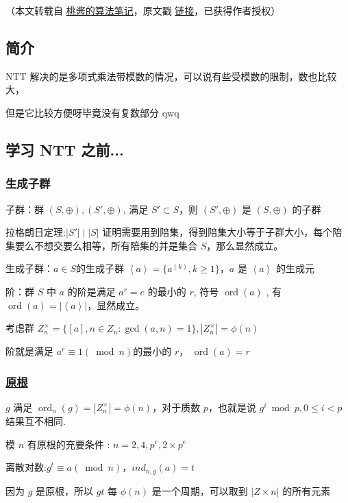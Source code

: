 
（本文转载自 \href{https://zhuanlan.zhihu.com/c_1005817911142838272}{桃酱的算法笔记}，原文戳 \href{https://zhuanlan.zhihu.com/p/41867199}{链接}，已获得作者授权）

\subsection{简介}

NTT 解决的是多项式乘法带模数的情况，可以说有些受模数的限制，数也比较大，

但是它比较方便呀毕竟没有复数部分 qwq

\subsection{学习 NTT 之前...}

\subsubsection{生成子群}

子群：群 $(S,⊕), (S′,⊕)$, 满足 $S′⊂S$，则 $(S′,⊕)$ 是 $(S,⊕)$ 的子群

拉格朗日定理:$|S′|∣|S |$ 证明需要用到陪集，得到陪集大小等于子群大小，每个陪集要么不想交要么相等，所有陪集的并是集合 $S$，那么显然成立。

生成子群：$a \in S$ ​的生成子群 $\left<a\right> = \{a^{(k)}, k \geq 1 \}$ ​，$a$ 是 $\left< a \right>$ 的生成元

阶：群 $S$ 中 $a$ 的阶是满足 $a^r=e$ 的最小的 $r$, 符号 $\operatorname{ord}(a)$ , 有 $\operatorname{ord}(a)=\left|\left<a\right>\right|$，显然成立。

考虑群 $Z_n^ \times =\{[a], n \in Z_n : \gcd(a, n) = 1\}, |Z_n^ \times | = \phi(n)$

阶就是满足 $a^r \equiv 1 (\bmod n)$ ​的最小的 $r$，  $\operatorname{ord}(a)=r$

\subsubsection{\href{/math/primitive-root}{原根}}

$g$ 满足 $\operatorname{ord}_n(g)=\left|Z_n^\times\right|=\phi(n)$，对于质数 $p$，也就是说 $g^i \bmod p, 0 \leq i < p$ 结果互不相同.

模 $n$ 有原根的充要条件 : $n = 2, 4, p^e, 2 \times p^e$

离散对数:$g^t \equiv a (\bmod n)，ind_{n,g}{(a)}=t$

​因为 $g$ 是原根，所以 $gt$ 每 $\phi(n)$ 是一个周期，可以取到 $| Z \times n |$ 的所有元素

